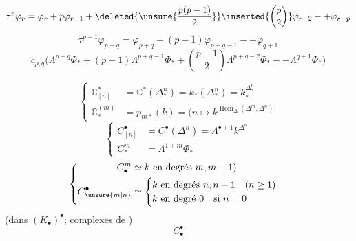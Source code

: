 \margin{\[
=c_{pq}\underbrace{\tau^{p-1}_{\deleted{\unsure{*}}}\varphi_{p+q}}(N+1)
\]
\[
\deleted{=\unsure{c_{pq}\tau}}\qquad
\deleted{\unsure{\tau^{p-1}}}
\]}

\[
\tau^p\varphi_r=\varphi_r+p\varphi_{r-1}
+\deleted{\unsure{\frac{p(p-1)}2}}\inserted{\binom p2}\varphi_{r-2}
-+\varphi_{r-p}
\]
\[
\tau^{p-1}\varphi_{p+q}=\varphi_{p+q}+(p-1)\varphi_{p+q-1}-+\varphi_{q+1}
\]
\[
c_{p,q}\bigl(\Lambda^{p+q}\Phi_*+(p-1)\Lambda^{p+q-1}\Phi_*
+\binom{p-1}{2}\Lambda^{p+q-2}\Phi_*-+\Lambda^{q+1}\Phi_*\bigr)
\]



\[
\left\{\begin{aligned}
\mathbb C_{[n]}^*&=\mathbb C^*(\Delta_*^n)=k_*(\Delta_*^n)=k_*^{\Delta_*^n}\\
\mathbb C_*^{(m)}&=p_{m*}(k)=(n\longmapsto k^{\operatorname{Hom}_\Delta(\Delta^m,\Delta^n)}
\end{aligned}\right.
\]
\[
\left\{\begin{aligned}
C_{[n]}^\bullet&=C^\bullet(\Delta^n)=\Lambda^{\bullet+1}k^{\Delta^n}\\
C_*^m&=\Lambda^{1+m}\Phi_*
\end{aligned}\right.
\]
\[
\left\{\begin{aligned}
C_\bullet^m&\simeq k\ \text{en degrés }m,m+1)\\
C_{\unsure{m|n}}^\bullet&\simeq
\begin{cases}k\ \text{en degrés }n,n-1\quad(n\geq1)\\
k\ \text{en degré }0\quad\text{si }n=0
\end{cases}
\end{aligned}\right.
\]
(dans $(K_\bullet)^\bullet$; complexes de )
\[
C_\bullet^\bullet
\]

